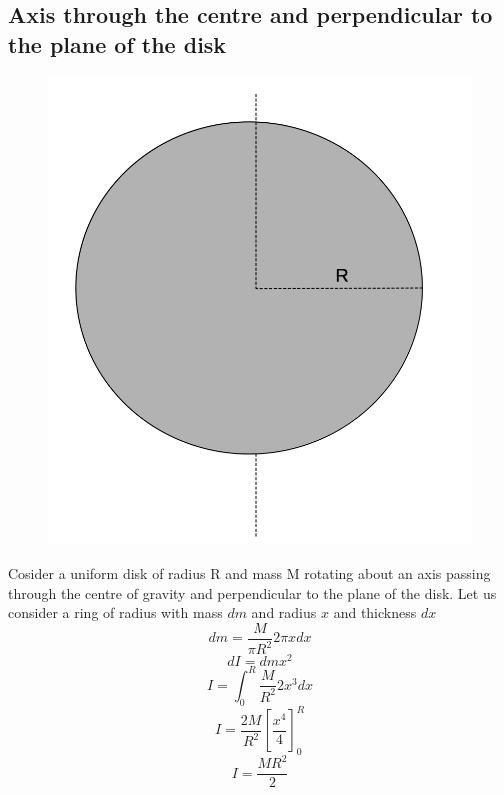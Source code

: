 \documentclass{article}
\begin{document}
\subsection{Axis through the centre and perpendicular to the plane of the disk}
\begin{figure}[h!]
  \centering
  \includegraphics[scale=0.3]{disk1.png}
\end{figure}
Cosider a uniform disk of radius R and mass M rotating about an axis passing through the centre of gravity and perpendicular to the plane of the disk.
Let us consider a ring of radius with mass $dm$ and radius $x$ and thickness $dx$
$$dm = \frac{M}{\pi R^2} 2\pi x dx$$
$$dI = dm x^2$$
$$I = \int_{0}^{R} \frac{M}{R^2} 2 x^3 dx$$
$$I = \frac{2M}{R^2} \left[ \frac{x^4}{4} \right]_{0}^{R}$$
$$\boxed{I = \frac{MR^2}{2}}$$
\end{document}
